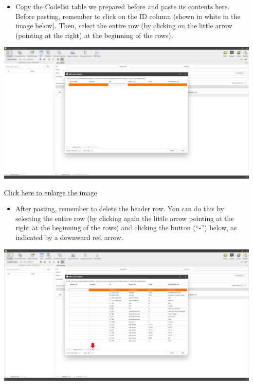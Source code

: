 \documentclass[
]{book}
\providecommand{\tightlist}{%
  \setlength{\itemsep}{0pt}\setlength{\parskip}{0pt}}
\theoremstyle{definition}
\theoremstyle{definition}
\theoremstyle{definition}
\theoremstyle{definition}
\theoremstyle{remark}
\begin{document}
\begin{itemize}
\tightlist
\item
  Copy the Codelist table we prepared before and paste its contents here. Before pasting, remember to click on the ID column (shown in white in the image below). Then, select the entire row (by clicking on the little arrow (pointing at the right) at the beginning of the rows).
\end{itemize}

\begin{center}\includegraphics[width=1\linewidth]{./images/image088} \end{center}

\href{images/image088.png}{Click here to enlarge the image}

\begin{itemize}
\tightlist
\item
  After pasting, remember to delete the header row. You can do this by selecting the entire row (by clicking again the little arrow pointing at the right at the beginning of the rows) and clicking the button (``-'') below, as indicated by a downward red arrow.
\end{itemize}

\begin{center}\includegraphics[width=1\linewidth]{./images/image090} \end{center}
\end{document}

